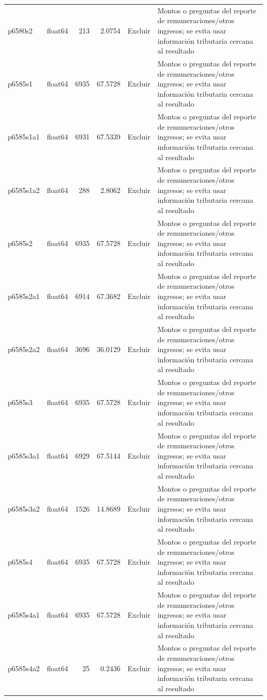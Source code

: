 \begin{longtable}{llrrll}
p6580s2 & float64 & 213 & 2.0754 & Excluir & Montos o preguntas del reporte de remuneraciones/otros ingresos; se evita usar información tributaria cercana al resultado \\
p6585s1 & float64 & 6935 & 67.5728 & Excluir & Montos o preguntas del reporte de remuneraciones/otros ingresos; se evita usar información tributaria cercana al resultado \\
p6585s1a1 & float64 & 6931 & 67.5339 & Excluir & Montos o preguntas del reporte de remuneraciones/otros ingresos; se evita usar información tributaria cercana al resultado \\
p6585s1a2 & float64 & 288 & 2.8062 & Excluir & Montos o preguntas del reporte de remuneraciones/otros ingresos; se evita usar información tributaria cercana al resultado \\
p6585s2 & float64 & 6935 & 67.5728 & Excluir & Montos o preguntas del reporte de remuneraciones/otros ingresos; se evita usar información tributaria cercana al resultado \\
p6585s2a1 & float64 & 6914 & 67.3682 & Excluir & Montos o preguntas del reporte de remuneraciones/otros ingresos; se evita usar información tributaria cercana al resultado \\
p6585s2a2 & float64 & 3696 & 36.0129 & Excluir & Montos o preguntas del reporte de remuneraciones/otros ingresos; se evita usar información tributaria cercana al resultado \\
p6585s3 & float64 & 6935 & 67.5728 & Excluir & Montos o preguntas del reporte de remuneraciones/otros ingresos; se evita usar información tributaria cercana al resultado \\
p6585s3a1 & float64 & 6929 & 67.5144 & Excluir & Montos o preguntas del reporte de remuneraciones/otros ingresos; se evita usar información tributaria cercana al resultado \\
p6585s3a2 & float64 & 1526 & 14.8689 & Excluir & Montos o preguntas del reporte de remuneraciones/otros ingresos; se evita usar información tributaria cercana al resultado \\
p6585s4 & float64 & 6935 & 67.5728 & Excluir & Montos o preguntas del reporte de remuneraciones/otros ingresos; se evita usar información tributaria cercana al resultado \\
p6585s4a1 & float64 & 6935 & 67.5728 & Excluir & Montos o preguntas del reporte de remuneraciones/otros ingresos; se evita usar información tributaria cercana al resultado \\
p6585s4a2 & float64 & 25 & 0.2436 & Excluir & Montos o preguntas del reporte de remuneraciones/otros ingresos; se evita usar información tributaria cercana al resultado \\

\end{longtable}
